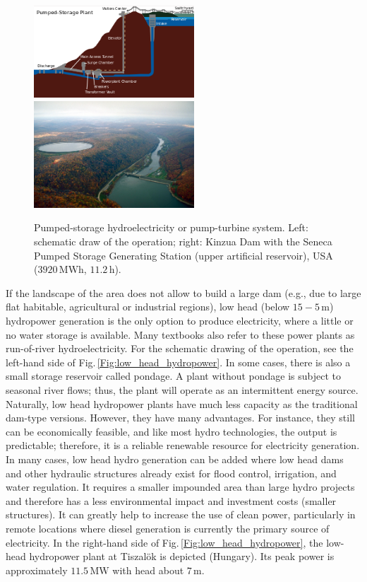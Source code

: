 \begin{figure}[ht!]
	\centering
		\includegraphics[width=6cm]{HydroAndWindPower/Figures/Schematics_Of_Pumped_Storage_Hydroelectricity.png}
		\includegraphics[width=6cm]{HydroAndWindPower/Figures/Kinzua_Dam.jpg}
	\caption{Pumped-storage hydroelectricity or pump-turbine system. Left: schematic draw of the operation; right: Kinzua Dam with the Seneca Pumped Storage Generating Station (upper artificial reservoir), USA ($3920\,\mathrm{MWh}$, $11.2\,\mathrm{h}$).}
	\label{Fig:pumped_storage_hydropower}
\end{figure}

If the landscape of the area does not allow to build a large dam (e.g., due to large flat habitable, agricultural or industrial regions), low head (below $15-5\,\mathrm{m}$) hydropower generation is the only option to produce electricity, where a little or no water storage is available. Many textbooks also refer to these power plants as run-of-river hydroelectricity. For the schematic drawing of the operation, see the left-hand side of Fig.\,\ref{Fig:low_head_hydropower}. In some cases, there is also a small storage reservoir called pondage. A plant without pondage is subject to seasonal river flows; thus, the plant will operate as an intermittent energy source. Naturally, low head hydropower plants have much less capacity as the traditional dam-type versions. However, they have many advantages. For instance, they still can be economically feasible, and like most hydro technologies, the output is predictable; therefore, it is a reliable renewable resource for electricity generation. In many cases, low head hydro generation can be added where low head dams and other hydraulic structures already exist for flood control, irrigation, and water regulation. It requires a smaller impounded area than large hydro projects and therefore has a less environmental impact and investment costs (smaller structures). It can greatly help to increase the use of clean power, particularly in remote locations where diesel generation is currently the primary source of electricity. In the right-hand side of Fig.\,\ref{Fig:low_head_hydropower}, the low-head hydropower plant at Tiszal\"ok is depicted (Hungary). Its peak power is approximately $11.5\,\mathrm{MW}$ with head about $7\,\mathrm{m}$. 


